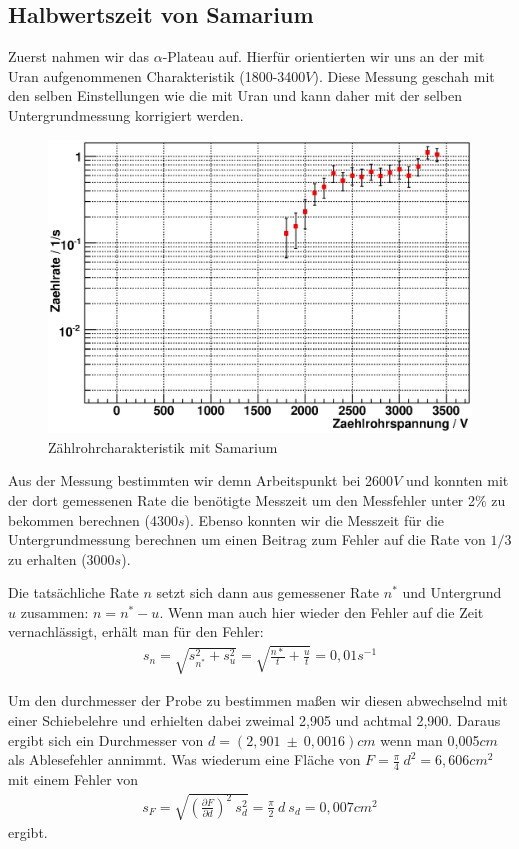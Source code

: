 \documentclass[12pt]{article}
\begin{document}
\subsection{Halbwertszeit von Samarium}
Zuerst nahmen wir das $\alpha$-Plateau auf. Hierfür orientierten wir uns an der mit Uran aufgenommenen Charakteristik (1800-3400$V$).
Diese Messung geschah mit den selben Einstellungen wie die mit Uran und kann daher mit der selben Untergrundmessung korrigiert werden.

\begin{figure}[H]  
\centering
\includegraphics[width=0.9\linewidth]{pictures/char_sam.eps}
\caption{Zählrohrcharakteristik mit Samarium}
\end{figure}

Aus der Messung bestimmten wir demn Arbeitspunkt bei 2600$V$ und konnten mit der dort gemessenen Rate die benötigte Messzeit um den Messfehler unter
2\% zu bekommen berechnen (4300$s$). Ebenso konnten wir die Messzeit für die Untergrundmessung berechnen um einen Beitrag zum Fehler auf die Rate
von $1/3$ zu erhalten (3000$s$).

Die tatsächliche Rate $n$ setzt sich dann aus gemessener Rate $n^*$ und Untergrund $u$ zusammen: $n = n^* - u$. Wenn man auch hier wieder den Fehler auf
die Zeit vernachlässigt, erhält man für den Fehler:
\begin{align}
 s_n = \sqrt{s_{n^*}^2 + s_u^2} = \sqrt{\frac{n*}{t} + \frac{u}{t}} = 0,01 s^{-1}
\end{align}

Um den durchmesser der Probe zu bestimmen maßen wir diesen abwechselnd mit einer Schiebelehre und erhielten dabei zweimal 2,905 und achtmal 2,900.
Daraus ergibt sich ein Durchmesser von $d = (2,901~ \pm~ 0,0016)cm$ wenn man 0,005$cm$ als Ablesefehler annimmt. Was wiederum eine Fläche von
$F = \frac{\pi}{4}~d^2 = 6,606 cm^2$ mit einem Fehler von
\begin{align}
 s_F = \sqrt{\left(\frac{\partial F}{\partial d}\right)^2~s_d^2} = \frac{\pi}{2}~d~s_d = 0,007 cm^2
\end{align}
ergibt.
\end{document}
